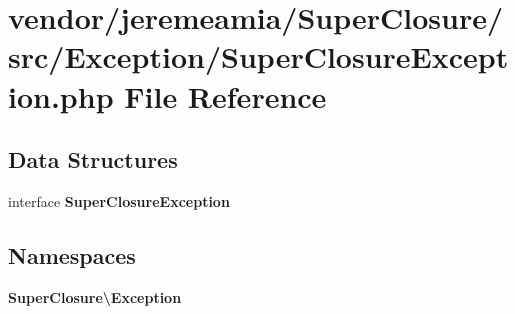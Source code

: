 \section{vendor/jeremeamia/\+Super\+Closure/src/\+Exception/\+Super\+Closure\+Exception.php File Reference}
\label{_super_closure_exception_8php}
\subsection*{Data Structures}
\begin{DoxyCompactItemize}
\item 
interface {\bf Super\+Closure\+Exception}
\end{DoxyCompactItemize}
\subsection*{Namespaces}
\begin{DoxyCompactItemize}
\item 
 {\bf Super\+Closure\textbackslash{}\+Exception}
\end{DoxyCompactItemize}
